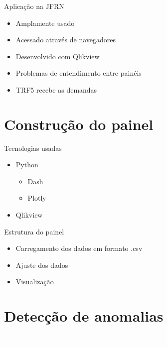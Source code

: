 \documentclass[10pt,t]{beamer}
\begin{document}
\begin{frame}{Aplicação na JFRN}\label{colorpalette}
\vspace{8pt}
    \begin{itemize}
    	\item Amplamente usado
    	\item Acessado através de navegadores
    	\item Desenvolvido com Qlikview
    	\item Problemas de entendimento entre painéis
    	\item TRF5 recebe as demandas
    \end{itemize}
\end{frame} 

\section{Construção do painel}

\begin{frame}{Tecnologias usadas}
\vspace{8pt}
    \begin{itemize}
        \item Python
        \begin{itemize}
            \item Dash
            \item Plotly
        \end{itemize}
        \item Qlikview
    \end{itemize}
\end{frame}

\begin{frame}{Estrutura do painel}
\vspace{8pt}
    \begin{itemize}
        \item Carregamento dos dados em formato .csv
        \item Ajuste dos dados
        \item Visualização
    \end{itemize}
\end{frame}

\section{Detecção de anomalias}




{

\begin{frame}[c,plain]{}
    \centering
    \textcolor{white}{Obrigado!}
\end{frame}

}
\end{document}
